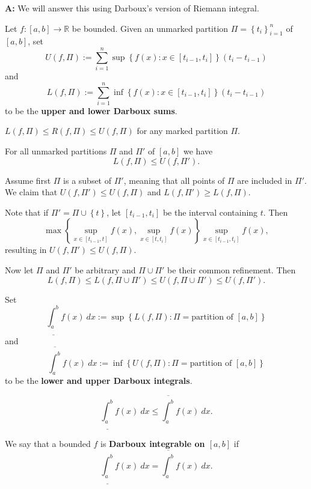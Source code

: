 \documentclass{notes}
\begin{document}
  {\boldmath \bfseries A:} We will answer this using Darboux's version of Riemann integral.
  
  \begin{defn}
    Let $f \colon [a, b] \to \mathbb R$ be bounded.
    Given an unmarked partition $\Pi = \left \{ t_i \right \}_{i = 1}^n$ of $[a, b]$, set 
    \[
      U(f, \Pi) := \sum_{i = 1}^n \sup \left \{ f(x) : x \in [t_{i - 1}, t_i] \right \} (t_i - t_{i - 1})
    \]
    and 
    \[
      L(f, \Pi) := \sum_{i = 1}^n \inf \left \{ f(x) : x \in [t_{i - 1}, t_i] \right \} (t_i - t_{i - 1})
    \]
    to be the {\boldmath \bfseries upper and lower Darboux sums}.
  \end{defn}
  
  \begin{note}
    $L(f, \Pi) \leq R(f, \Pi) \leq U(f, \Pi)$ for any marked partition $\Pi$.
  \end{note}
  
  \begin{lem}
    For all unmarked partitions $\Pi$ and $\Pi'$ of $[a, b]$ we have 
    \[
      L(f, \Pi) \leq U(f, \Pi').
    \]
  \end{lem}
  
  \begin{prf}
    Assume first $\Pi$ is a subset of $\Pi'$, meaning that all points of $\Pi$ are included in $\Pi'$.
    We claim that $U(f, \Pi') \leq U(f, \Pi)$ and $L(f, \Pi') \geq L(f, \Pi)$.
    
    Note that if $\Pi' = \Pi \cup \left \{ t \right \}$, let $[t_{i - 1}, t_i]$ be the interval containing $t$.
    Then 
    \[
      \max \left \{ \sup_{x \in [t_{i - 1}, t]} f(x), \sup_{x \in [t, t_i]} f(x) \right \} \sup_{x \in [t_{i - 1}, t_i]} f(x), 
    \]
    resulting in $U(f, \Pi') \leq U(f, \Pi)$.

    Now let $\Pi$ and $\Pi'$ be arbitrary and $\Pi \cup \Pi'$ be their common refinement.
    Then 
    \[
      L(f, \Pi) \leq L(f, \Pi \cup \Pi') \leq U(f, \Pi \cup \Pi') \leq U(f, \Pi').
    \]
  \end{prf}
  
  \begin{defn}
    Set 
    \[
      \underline{\int_a^b} f(x)\ dx := \sup \left \{ L(f, \Pi) : \Pi = \text{partition of $[a, b]$} \right \}
    \]
    and 
    \[
      \overline{\int_a^b} f(x)\ dx := \inf \left \{ U(f, \Pi) : \Pi = \text{partition of $[a, b]$} \right \}
    \]
    to be the {\boldmath \bfseries lower and upper Darboux integrals}.
  \end{defn}
  
  \begin{note}
    \[
      \underline{\int_a^b} f(x)\ dx \leq \overline{\int_a^b} f(x)\ dx.
    \]
  \end{note}
  
  \begin{defn}
    We say that a bounded $f$ is {\boldmath \bfseries Darboux integrable on $[a, b]$} if 
    \[
      \underline{\int_a^b} f(x)\ dx = \overline{\int_a^b} f(x)\ dx.
    \]
  \end{defn}
\end{document}
